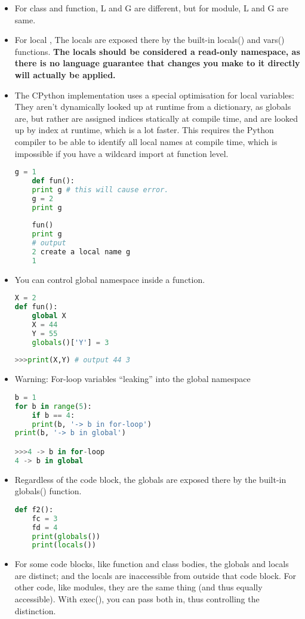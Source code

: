 \documentclass[a4paper,12pt,twoside]{book}
\begin{document}
\begin{itemize}
	\item For class and function, L and G are different, but for module, L and G are same.
	\item For local , The locals are exposed there by the built-in locals() and vars() functions. \textbf{The locals should be considered a read-only namespace, as there is no language guarantee that changes you make to it directly will actually be applied.}
		\item The CPython implementation uses a special optimisation for local variables: They aren't dynamically looked up at runtime from a dictionary, as globals are, but rather are assigned indices statically at compile time, and are looked up by index at runtime, which is a lot faster. This requires the Python compiler to be able to identify all local names at compile time, which is impossible if you have a wildcard import at function level.
	\begin{lstlisting}[frame=single, language=Python]
	g = 1
	def fun():
	print g # this will cause error. 
	g = 2
	print g
	
	fun()
	print g
	# output 
	2 create a local name g
	1
	\end{lstlisting}  
	\item You can control global namespace inside a function.
\begin{lstlisting}[frame=single, language=Python]
X = 2
def fun():
	global X
	X = 44
	Y = 55
	globals()['Y'] = 3
	
>>>print(X,Y) # output 44 3
\end{lstlisting}  

\item Warning: For-loop variables “leaking” into the global namespace
\begin{lstlisting}[frame=single, language=Python]
b = 1
for b in range(5):
	if b == 4:
	print(b, '-> b in for-loop')
print(b, '-> b in global')

>>>4 -> b in for-loop
4 -> b in global
\end{lstlisting}  

	\item Regardless of the code block, the globals are exposed there by the built-in globals() function. 
\begin{lstlisting}[frame=single, language=Python]
	def f2():
	fc = 3
	fd = 4
	print(globals())
	print(locals())
\end{lstlisting}  
	
	\item For some code blocks, like function and class bodies, the globals and locals are distinct; and the locals are inaccessible from outside that code block. For other code, like modules, they are the same thing (and thus equally accessible). With exec(), you can pass both in, thus controlling the distinction.


\end{itemize}
\end{document}
